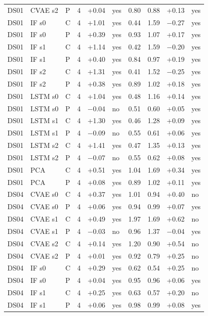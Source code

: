 \documentclass[10pt]{article}
\begin{document}
{\begin{longtable}{lllrrlrrrl}
DS01 & CVAE s2 & P & 4 & +0.04 & yes & 0.80 & 0.88 & +0.13 & yes \\
DS01 & IF s0 & C & 4 & +1.01 & yes & 0.44 & 1.59 & −0.27 & yes \\
DS01 & IF s0 & P & 4 & +0.39 & yes & 0.93 & 1.07 & +0.17 & yes \\
DS01 & IF s1 & C & 4 & +1.14 & yes & 0.42 & 1.59 & −0.20 & yes \\
DS01 & IF s1 & P & 4 & +0.40 & yes & 0.84 & 0.97 & +0.19 & yes \\
DS01 & IF s2 & C & 4 & +1.31 & yes & 0.41 & 1.52 & −0.25 & yes \\
DS01 & IF s2 & P & 4 & +0.38 & yes & 0.89 & 1.02 & +0.18 & yes \\
DS01 & LSTM s0 & C & 4 & +1.04 & yes & 0.48 & 1.16 & +0.14 & yes \\
DS01 & LSTM s0 & P & 4 & −0.04 & no & 0.51 & 0.60 & +0.05 & yes \\
DS01 & LSTM s1 & C & 4 & +1.30 & yes & 0.46 & 1.28 & +0.09 & yes \\
DS01 & LSTM s1 & P & 4 & −0.09 & no & 0.55 & 0.61 & +0.06 & yes \\
DS01 & LSTM s2 & C & 4 & +1.41 & yes & 0.47 & 1.35 & +0.13 & yes \\
DS01 & LSTM s2 & P & 4 & −0.07 & no & 0.55 & 0.62 & +0.08 & yes \\
DS01 & PCA & C & 4 & +0.51 & yes & 1.04 & 1.69 & +0.34 & yes \\
DS01 & PCA & P & 4 & +0.08 & yes & 0.89 & 1.02 & +0.11 & yes \\
\midrule
DS04 & CVAE s0 & C & 4 & +0.37 & yes & 1.01 & 0.94 & +0.40 & no \\
DS04 & CVAE s0 & P & 4 & +0.06 & yes & 0.94 & 0.99 & +0.07 & yes \\
DS04 & CVAE s1 & C & 4 & +0.49 & yes & 1.97 & 1.69 & +0.62 & no \\
DS04 & CVAE s1 & P & 4 & −0.03 & no & 0.96 & 1.37 & −0.04 & yes \\
DS04 & CVAE s2 & C & 4 & +0.14 & yes & 1.20 & 0.90 & +0.54 & no \\
DS04 & CVAE s2 & P & 4 & +0.01 & yes & 0.92 & 0.79 & +0.25 & no \\
DS04 & IF s0 & C & 4 & +0.29 & yes & 0.62 & 0.54 & +0.25 & no \\
DS04 & IF s0 & P & 4 & +0.04 & yes & 0.95 & 0.96 & +0.06 & yes \\
DS04 & IF s1 & C & 4 & +0.25 & yes & 0.63 & 0.57 & +0.20 & no \\
DS04 & IF s1 & P & 4 & +0.06 & yes & 0.98 & 0.99 & +0.08 & yes \\

\end{longtable}}
\end{document}

